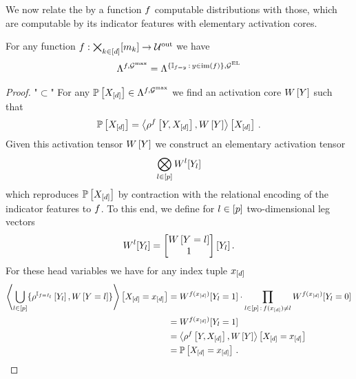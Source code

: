 We now relate the by a function $f$ computable distributions with those, which are computable by its indicator features with elementary activation cores.

\begin{lemma}
    \label{lem:computableByFunctionEqualElementaryIndicators}
    For any function $f:\bigtimes_{k\in[d]}[m_{k}]\rightarrow\mathcal{U}^{\mathrm{out}}$ we have
    \begin{align*}
        \Lambda^{f,\mathcal{G}^{\mathrm{max}}}
        = \Lambda^{\{\mathbb{I}_{f=y}\,:\,y\in\mathrm{im}\left(f\right)\},\mathcal{G}^{\mathrm{EL}}}
    \end{align*}
\end{lemma}
\begin{proof}
    "$\subset$"
    For any $\mathbb{P}\left[X_{[d]}\right]\in\Lambda^{f,\mathcal{G}^{\mathrm{max}}}$ we find an activation core $W\left[Y\right]$ such that
    \begin{align*}
        \mathbb{P}\left[X_{[d]}\right] = \left\langle \rho^{f}\left[Y,X_{[d]}\right],W\left[Y\right]\right\rangle \left[ X_{[d]} \right] \, .
    \end{align*}
    Given this activation tensor $W\left[Y\right]$ we construct an elementary activation tensor
    \begin{align*}
        \bigotimes_{l\in[p]}W^{l}[Y_{l}]
    \end{align*}
    which reproduces $\mathbb{P}\left[X_{[d]}\right]$ by contraction with the relational encoding of the indicator features to $f$. %
    To this end, we define for $l\in[p]$ two-dimensional leg vectors
    \begin{align*}
        W^{l}[Y_{l}]
        = \begin{bmatrix}
              W\left[Y=l\right] \\
              1
        \end{bmatrix}[Y_{l}] \, .
    \end{align*}
    For these head variables we have for any index tuple $x_{[d]}$
    \begin{align*}
        \left\langle \bigcup_{l\in[p]}\{\rho^{\mathbb{I}_{f=I_{l}}}\left[Y_{l}\right],W\left[Y=l\right]\}\right\rangle \left[ X_{[d]}=x_{[d]} \right]
        & = W^{f(x_{[d]})}[Y_{l}=1] \cdot \prod_{l\in[p] \,:\, f(x_{[d]}) \neq l} W^{f(x_{[d]})}[Y_{l}=0] \\
        & = W^{f(x_{[d]})}[Y_{l}=1] \\
        & = \left\langle \rho^{f}\left[Y,X_{[d]}\right],W\left[Y\right]\right\rangle \left[ X_{[d]}=x_{[d]} \right] \\
        & = \mathbb{P}\left[X_{[d]}=x_{[d]}\right] \, .
    \end{align*}


\end{proof}
